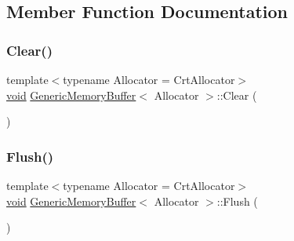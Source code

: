 \subsection{Member Function Documentation}
\mbox{\label{structGenericMemoryBuffer_a036cbe2556778e1edc525602a9821df2}} 
\subsubsection{\texorpdfstring{Clear()}{Clear()}}
{\footnotesize\ttfamily template$<$typename Allocator  = Crt\+Allocator$>$ \\
\hyperlink{imgui__impl__opengl3__loader_8h_ac668e7cffd9e2e9cfee428b9b2f34fa7}{void} \hyperlink{structGenericMemoryBuffer}{Generic\+Memory\+Buffer}$<$ Allocator $>$\+::Clear (\begin{DoxyParamCaption}{ }\end{DoxyParamCaption})\hspace{0.3cm}{\ttfamily [inline]}}

\mbox{\label{structGenericMemoryBuffer_a9861181cab6f5bec2ec08b601aa53575}} 
\subsubsection{\texorpdfstring{Flush()}{Flush()}}
{\footnotesize\ttfamily template$<$typename Allocator  = Crt\+Allocator$>$ \\
\hyperlink{imgui__impl__opengl3__loader_8h_ac668e7cffd9e2e9cfee428b9b2f34fa7}{void} \hyperlink{structGenericMemoryBuffer}{Generic\+Memory\+Buffer}$<$ Allocator $>$\+::Flush (\begin{DoxyParamCaption}{ }\end{DoxyParamCaption})\hspace{0.3cm}{\ttfamily [inline]}}

\mbox{\label{structGenericMemoryBuffer_a8d7be8b1d64285b787571541a7c4bb37}} 
